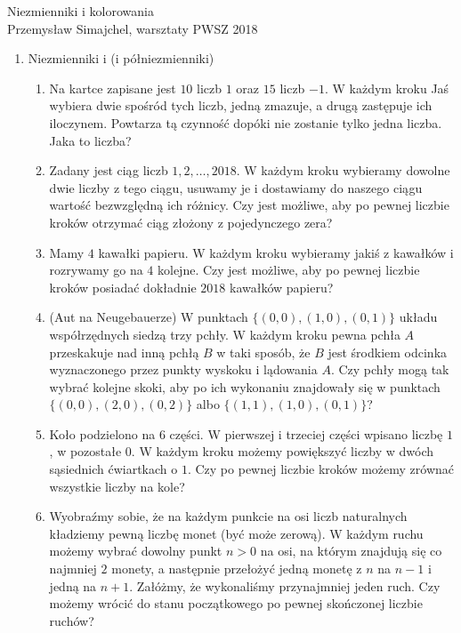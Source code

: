 \documentclass{article}
\begin{document}
{\begin{center}\LARGE Niezmienniki i kolorowania \\\large Przemysław Simajchel, warsztaty PWSZ 2018 \smallskip\end{center}}
		\begin{enumerate}[\Roman*.]
			\item Niezmienniki i (i półniezmienniki)
			
			\begin{enumerate}[1.]		
				\item Na kartce zapisane jest $10$ liczb $1$ oraz $15$ liczb $-1$. W każdym kroku Jaś wybiera dwie spośród tych liczb, jedną zmazuje, a drugą zastępuje ich iloczynem. Powtarza tą czynność dopóki nie zostanie tylko jedna liczba. Jaka to liczba?
				
				\item Zadany jest ciąg liczb $1, 2, \ldots , 2018$. W każdym kroku wybieramy dowolne dwie liczby z tego ciągu, usuwamy je i dostawiamy do naszego ciągu wartość bezwzględną ich różnicy. Czy jest możliwe, aby po pewnej liczbie kroków otrzymać ciąg złożony z pojedynczego zera?
				
				\item Mamy $4$ kawałki papieru. W każdym kroku wybieramy jakiś z kawałków i rozrywamy go na $4$ kolejne. Czy jest możliwe, aby po pewnej liczbie kroków posiadać dokładnie $2018$ kawałków papieru?

				\item (Aut na Neugebauerze) W punktach $\{(0, 0), (1, 0), (0, 1)\}$ układu współrzędnych siedzą trzy pchły. W każdym kroku pewna pchła $A$ przeskakuje nad inną pchłą $B$ w taki sposób, że $B$ jest środkiem odcinka wyznaczonego przez punkty wyskoku i lądowania $A$. Czy pchły mogą tak wybrać kolejne skoki, aby po ich wykonaniu znajdowały się w punktach $\{(0, 0), (2, 0), (0, 2)\}$ albo $\{(1, 1), (1, 0), (0, 1)\}$? 

				\item Koło podzielono na $6$ części. W pierwszej i trzeciej części wpisano liczbę $1$, w pozostałe $0$. W każdym kroku możemy powiększyć liczby w dwóch sąsiednich ćwiartkach o $1$. Czy po pewnej liczbie kroków możemy zrównać wszystkie liczby na kole?

				\item Wyobraźmy sobie, że na każdym punkcie na osi liczb naturalnych kładziemy pewną liczbę monet (być może zerową). W każdym ruchu możemy wybrać dowolny punkt $n > 0$ na osi, na którym znajdują się co najmniej $2$ monety, a następnie przełożyć jedną monetę z $n$ na $n-1$ i jedną na $n+1$. Załóżmy, że wykonaliśmy przynajmniej jeden ruch. Czy możemy wrócić do stanu początkowego po pewnej skończonej liczbie ruchów?


\end{enumerate}
\end{enumerate}
\end{document}
